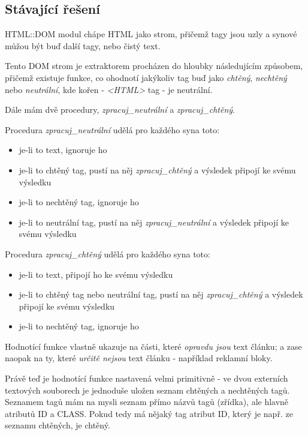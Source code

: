 \documentclass[12pt]{amsart}
\begin{document}
\subsection{Stávající řešení}
HTML::DOM modul chápe HTML jako strom, při\-čemž tagy jsou uzly a synové můžou být buď další tagy, nebo čistý text. 

Tento DOM strom je extraktorem procházen do hloubky následujícím způsobem, přičemž existuje funkce, co ohodnotí jakýkoliv tag buď jako \emph{chtěný}, \emph{nechtěný} nebo \emph{neutrální}, kde kořen - \emph{\textless HTML\textgreater} tag - je neutrální.

Dále mám dvě procedury, \emph{zpracuj\_neutrální} a \emph{zpracuj\_chtěný}.

Procedura \emph{zpracuj\_neutrální} udělá pro každého syna toto: 

\begin{itemize}
    \item je-li to text, ignoruje ho
    \item je-li to chtěný tag, pustí na něj \emph{zpracuj\_chtěný} a vý\-sle\-dek připojí ke svému výsledku
    \item je-li to nechtěný tag, ignoruje ho
    \item je-li to neutrální tag, pustí na něj \emph{zpracuj\_neutrální} a vý\-sle\-dek připojí ke svému výsledku
\end{itemize}

Procedura \emph{zpracuj\_chtěný} udělá pro každého syna toto: 

\begin{itemize}
    \item je-li to text, připojí ho ke svému výsledku
    \item je-li to chtěný tag nebo neutrální tag, pustí na něj \emph{zpracuj\_chtěný} a vý\-sle\-dek připojí ke svému výsledku
    \item je-li to nechtěný tag, ignoruje ho
\end{itemize}

Hodnotící funkce vlastně ukazuje na části, které \emph{opravdu jsou} text článku; a zase naopak na ty, které \emph{určitě nejsou} text článku - například reklamní bloky.

Právě teď je hodnotící funkce nastavená velmi primitivně - ve dvou externích textových souborech je jednoduše uložen seznam chtěných a nechtěných tagů. Seznamem tagů mám na mysli seznam přímo názvů tagů (zřídka), ale hlavně atributů ID a CLASS. Pokud tedy má nějaký tag atribut ID, který je např. ze seznamu chtěných, je chtěný.
\end{document}
